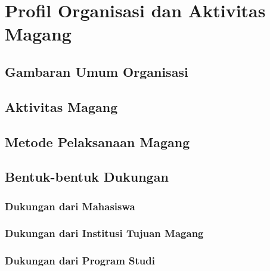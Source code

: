 \chapter{Profil Organisasi dan Aktivitas Magang}

\section{Gambaran Umum Organisasi}

\section{Aktivitas Magang}

\section{Metode Pelaksanaan Magang}

\section{Bentuk-bentuk Dukungan}

\subsection{Dukungan dari Mahasiswa}

\subsection{Dukungan dari Institusi Tujuan Magang}

\subsection{Dukungan dari Program Studi}

